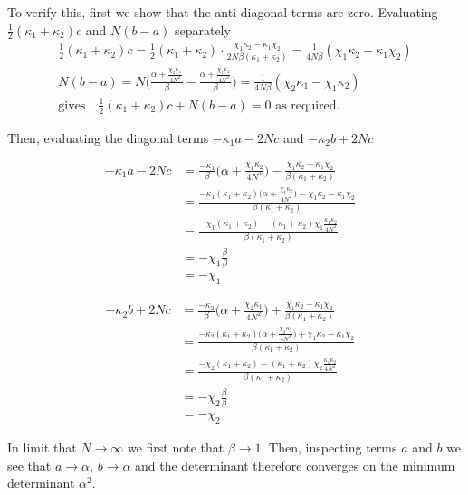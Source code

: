 \documentclass[11pt,a4paper]{article}
\numberwithin{equation}{section}
\begin{document}
	To verify this, first we show that the anti-diagonal terms are zero. Evaluating $\frac{1}{2}(\kappa_1 + \kappa_2)c$ and $N(b-a)$ separately
	\begin{align*}
	&\frac{1}{2}(\kappa_1 + \kappa_2) c = \frac{1}{2}(\kappa_1 + \kappa_2) \cdot \frac{\chi_1 \kappa_2 - \kappa_1 \chi_2}{2N\beta (\kappa_1+\kappa_2)} = \frac{1}{4N\beta}(\chi_1 \kappa_2 - \kappa_1 \chi_2)&\\
	&N(b-a)= N \Big(\frac{\alpha + \frac{\chi_2 \kappa_1}{4N^2}}{\beta} -\frac{\alpha + \frac{\chi_1 \kappa_2}{4N^2}}{\beta}\Big) = \frac{1}{4N\beta}(\chi_2 \kappa_1 - \chi_1 \kappa_2)&\\
	&\text{gives}\quad\frac{1}{2}(\kappa_1 + \kappa_2)c + N(b-a) = 0\text{ as required.}&
	\end{align*}
	
	Then, evaluating the diagonal terms $-\kappa_1 a - 2Nc$ and $-\kappa_2 b + 2Nc$
	
	\begin{align*}
	-\kappa_1 a - 2Nc &= \frac{-\kappa_1}{\beta} \Big(\alpha + \frac{\chi_1 \kappa_2}{4N^2} \Big) - \frac{\chi_1 \kappa_2 - \kappa_1 \chi_2}{\beta (\kappa_1+\kappa_2)}&\\
	&= \frac{-\kappa_1 (\kappa_1+\kappa_2) \Big(\alpha + \frac{\chi_1 \kappa_2}{4N^2} \Big) - \chi_1 \kappa_2 - \kappa_1 \chi_2}{\beta (\kappa_1+\kappa_2)}&\\
	&= \frac{-\chi_1(\kappa_1+\kappa_2)- (\kappa_1+\kappa_2)\chi_1 \frac{\kappa_1 \kappa_2}{4N^2}}{\beta (\kappa_1+\kappa_2)}&\\
	&= -\chi_1 \frac{\beta}{\beta}&\\
	&= -\chi_1&
	\end{align*}
	
	\begin{align*}
	-\kappa_2 b + 2Nc &= \frac{-\kappa_2}{\beta} \Big(\alpha + \frac{\chi_2 \kappa_1}{4N^2} \Big) + \frac{\chi_1 \kappa_2 - \kappa_1 \chi_2}{\beta (\kappa_1+\kappa_2)}&\\
	&= \frac{-\kappa_2 (\kappa_1+\kappa_2) \Big(\alpha + \frac{\chi_2 \kappa_1}{4N^2} \Big) + \chi_1 \kappa_2 - \kappa_1 \chi_2}{\beta (\kappa_1+\kappa_2)}&\\
	&= \frac{-\chi_2(\kappa_1+\kappa_2)- (\kappa_1+\kappa_2)\chi_2 \frac{\kappa_1 \kappa_2}{4N^2}}{\beta (\kappa_1+\kappa_2)}&\\
	&= -\chi_2 \frac{\beta}{\beta}&\\
	&= - \chi_2&
	\end{align*}
	

	In limit that $N \rightarrow \infty$ we first note that $\beta \rightarrow 1$. Then, inspecting terms $a$ and $b$ we see that $a \rightarrow \alpha$, $b \rightarrow \alpha$ and the determinant therefore converges on the minimum determinant $\alpha^2$.
	
\end{document}

